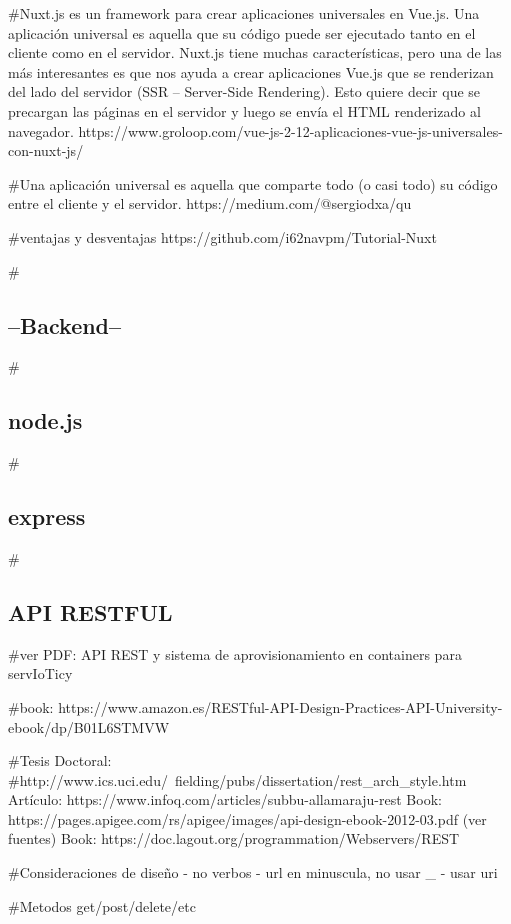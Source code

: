 #Nuxt.js es un framework para crear aplicaciones universales en Vue.js. Una aplicación universal es aquella que su código puede ser ejecutado tanto en el cliente como en el servidor. Nuxt.js tiene muchas características, pero una de las más interesantes es que nos ayuda a crear aplicaciones Vue.js que se renderizan del lado del servidor (SSR – Server-Side Rendering). Esto quiere decir que se precargan las páginas en el servidor y luego se envía el HTML renderizado al navegador.
https://www.groloop.com/vue-js-2-12-aplicaciones-vue-js-universales-con-nuxt-js/

#Una aplicación universal es aquella que comparte todo (o casi todo) su código entre el cliente y el servidor.
https://medium.com/@sergiodxa/qu%

#ventajas y desventajas
https://github.com/i62navpm/Tutorial-Nuxt

#\subsection{--Backend--}
#\subsection{node.js}
#\subsection{express}
#\subsection{API RESTFUL}
#ver PDF: API REST y sistema de aprovisionamiento en containers para servIoTicy

#book: https://www.amazon.es/RESTful-API-Design-Practices-API-University-ebook/dp/B01L6STMVW

#Tesis Doctoral: #http://www.ics.uci.edu/~fielding/pubs/dissertation/rest_arch_style.htm
Artículo: https://www.infoq.com/articles/subbu-allamaraju-rest
Book: https://pages.apigee.com/rs/apigee/images/api-design-ebook-2012-03.pdf (ver fuentes)
Book: https://doc.lagout.org/programmation/Webservers/REST%

#Consideraciones de diseño 
  - no verbos
  - url en minuscula, no usar _ 
  - usar uri
  
#Metodos get/post/delete/etc

